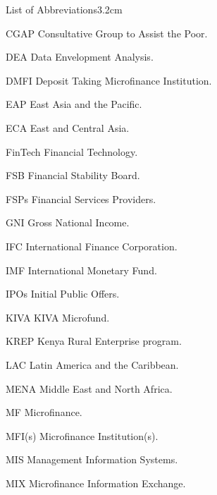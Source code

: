 \begin{mclistof}{List of Abbreviations}{3.2cm}

\item[CGAP] Consultative Group to Assist the Poor.

\item[DEA] Data Envelopment Analysis.

\item[DMFI] Deposit Taking Microfinance Institution.

\item[EAP] East Asia and the Pacific.

\item[ECA] East and Central Asia.

\item[FinTech] Financial Technology.

\item[FSB] Financial Stability Board.

\item[FSPs] Financial Services Providers.

\item[GNI] Gross National Income.

\item[IFC] International Finance Corporation.

\item[IMF] International Monetary Fund.

\item[IPOs] Initial Public Offers.

\item[KIVA] KIVA Microfund.

\item[KREP] Kenya Rural Enterprise program.

\item[LAC] Latin America and the Caribbean.

\item[MENA] Middle East and North Africa.

\item[MF] Microfinance.

\item[MFI(s)] Microfinance Institution(s).

\item[MIS] Management Information Systems.

\item[MIX] Microfinance Information Exchange.


\end{mclistof}
